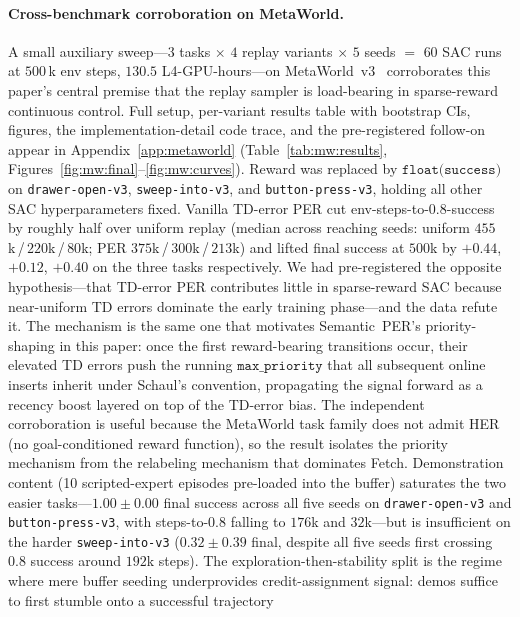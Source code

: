 \documentclass{article}
\begin{document}
\paragraph{Cross-benchmark corroboration on MetaWorld.}
\label{sec:disc:metaworld}
A small auxiliary sweep---$3$ tasks $\times$ $4$ replay variants
$\times$ $5$ seeds $=$ $60$ SAC runs at $500$\,k env steps, $130.5$
L4-GPU-hours---on MetaWorld~v3~\citep{yu2019metaworld} corroborates
this paper's central premise that the replay sampler is load-bearing
in sparse-reward continuous control. Full setup, per-variant
results table with bootstrap CIs, figures, the implementation-detail
code trace, and the pre-registered follow-on appear in
Appendix~\ref{app:metaworld}
(Table~\ref{tab:mw:results}, Figures~\ref{fig:mw:final}--\ref{fig:mw:curves}). Reward was replaced by
$\texttt{float(success)}$ on \texttt{drawer-open-v3},
\texttt{sweep-into-v3}, and \texttt{button-press-v3}, holding all
other SAC hyperparameters fixed. Vanilla TD-error PER cut
env-steps-to-$0.8$-success by roughly half over uniform replay (median
across reaching seeds: uniform $455$k\,/\,$220$k\,/\,$80$k;
PER $375$k\,/\,$300$k\,/\,$213$k) and lifted final success at
$500$k by $+0.44$, $+0.12$, $+0.40$ on the three tasks respectively.
We had pre-registered the opposite hypothesis---that TD-error PER
contributes little in sparse-reward SAC because near-uniform TD errors
dominate the early training phase---and the data refute it. The
mechanism is the same one that motivates Semantic~PER's
priority-shaping in this paper: once the first reward-bearing
transitions occur, their elevated TD errors push the running
$\texttt{max\_priority}$ that all subsequent online inserts inherit
under Schaul's convention, propagating the signal forward as a
recency boost layered on top of the TD-error bias. The independent
corroboration is useful because the MetaWorld task family does not
admit HER (no goal-conditioned reward function), so the result
isolates the priority mechanism from the relabeling mechanism that
dominates Fetch.
Demonstration content (10 scripted-expert episodes pre-loaded
into the buffer) saturates the two easier tasks---$1.00 \pm 0.00$
final success across all five seeds on \texttt{drawer-open-v3} and
\texttt{button-press-v3}, with steps-to-$0.8$ falling to $176$k and
$32$k---but is insufficient on the harder \texttt{sweep-into-v3}
($0.32 \pm 0.39$ final, despite all five seeds first crossing $0.8$
success around $192$k steps). The exploration-then-stability split is
the regime where mere buffer seeding underprovides credit-assignment
signal: demos suffice to first stumble onto a successful trajectory
\end{document}
